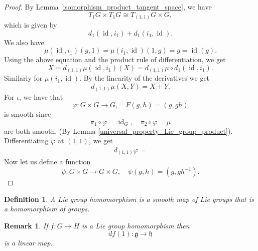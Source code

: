 \documentclass{article}
\newtheorem{definition}{Definition}[section]
\newtheorem{remark}{Remark}[section]
\numberwithin{equation}{section}
\DeclareMathOperator{\id}{id}
\begin{document}
\begin{proof}
By Lemma \ref{isomorphism_product_tangent_space}, we have
\begin{equation*}
T_1G\times T_1G\cong T_{(1,1)}G\times G,
\end{equation*}
which is given by
\begin{equation*}
d_1(\id,i_1)+d_1(i_1,\id).
\end{equation*}
We also have
\begin{equation*}
\mu(\id,i_1)(g,1) =\mu(i_1,\id)(1,g) = g=\id(g).
\end{equation*}
Using the above equation and the product rule of differentiation, we get
\begin{equation*}
X=d_{(1,1)}\mu(\id,i_1)(X) = d_{(1,1)}\mu\circ d_1(\id,i_1).
\end{equation*}
Similarly for $\mu(i_1,\id)$. By the linearity of the derivatives we get 
\begin{equation*}
d_{(1,1)}\mu(X,Y) = X+Y.
\end{equation*}
For $\iota$, we have that 
\begin{equation*}
\varphi:G\times G\to G, \quad F(g,h) = (g,gh)
\end{equation*}
is smooth since
\begin{equation*}
\pi_1\circ \varphi= \id_G,\quad \pi_2\circ \varphi = \mu
\end{equation*}
are both smooth. (By Lemma \ref{universal_property_Lie_group_product}). Differentiating $\varphi$ at $(1,1)$, we get
\begin{align*}
d_{(1,1)}\varphi = 
\end{align*}
Now let us define a function 
\begin{equation*}
\psi:G\times G\to G\times G,\quad \psi(g,h) = (g,gh^{-1}).
\end{equation*}
\end{proof}

\begin{definition}
A Lie group homomorphism is a smooth map of Lie groups that is a homomorphism of groups.
\end{definition}

\begin{remark}
If $f:G\to H$ is a Lie group homomorphism then 
\begin{equation*}
df(1):\mathfrak{g}\to \mathfrak{h}
\end{equation*}
is a linear map.
\end{remark}
\end{document}
